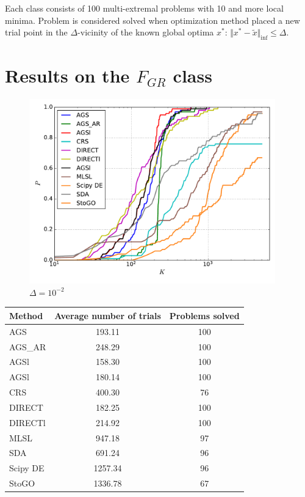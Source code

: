 \documentclass[a4paper]{article}
\begin{document}
Each class consists of 100 multi-extremal problems with 10 and more local minima. Problem is considered solved when optimization method placed a new trial point in the $\Delta$-vicinity of the known global optima $x^*$: $\Vert x^* - \widetilde{x} \Vert_{\inf} \le \Delta$.


\section{Results on the $F_{GR}$ class}

\begin{figure}[H]
  \center
  \includegraphics[width=0.95\textwidth]{../experiments/grish/cmc.pdf}
  \caption{$\Delta=10^{-2}$}
\end{figure}

\begin{tabular}{lcc}
\hline
 Method   &  Average number of trials  &  Problems solved  \\
\hline
 AGS      &           193.11           &        100        \\
 AGS\_AR   &           248.29           &        100        \\
 AGSl     &           158.30           &        100        \\
 AGSl     &           180.14           &        100        \\
 CRS      &           400.30           &        76         \\
 DIRECT   &           182.25           &        100        \\
 DIRECTl  &           214.92           &        100        \\
 MLSL     &           947.18           &        97         \\
 SDA      &           691.24           &        96         \\
 Scipy DE &          1257.34           &        96         \\
 StoGO    &          1336.78           &        67         \\
\hline
\end{tabular}
\end{document}
